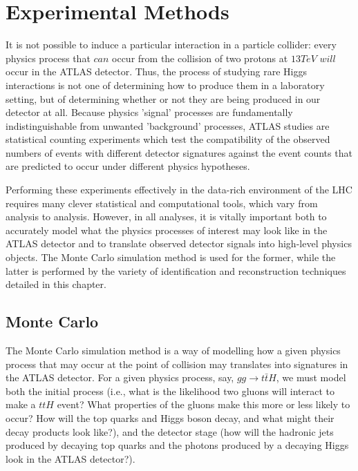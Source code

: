 \section{Experimental Methods} \label{sec:methods} 

It is not possible to induce a particular interaction in a particle collider: every physics process that $can$ occur from the collision of two protons at $13 TeV$ $will$ occur in the ATLAS detector. Thus, the process of studying rare Higgs interactions is not one of determining how to produce them in a laboratory setting, but of determining whether or not they are being produced in our detector at all. Because physics 'signal' processes are fundamentally indistinguishable from unwanted 'background' processes, ATLAS studies are statistical counting experiments which test the compatibility of the observed numbers of events with different detector signatures against the event counts that are predicted to occur under different physics hypotheses. 

Performing these experiments effectively in the data-rich environment of the LHC requires many clever statistical and computational tools, which vary from analysis to analysis. However, in all analyses, it is vitally important both to accurately model what the physics processes of interest may look like in the ATLAS detector and to translate observed detector signals into high-level physics objects. The Monte Carlo simulation method is used for the former, while the latter is performed by the variety of identification and reconstruction techniques detailed in this chapter.

\subsection{Monte Carlo} \label{sec:MC} 

The Monte Carlo simulation method is a way of modelling how a given physics process that may occur at the point of collision may translates into signatures in the ATLAS detector. For a given physics process, say, $gg \rightarrow t \bar{t} H$, we must model both the initial process (i.e., what is the likelihood two gluons will interact to make a $ttH$ event? What properties of the gluons make this more or less likely to occur? How will the top quarks and Higgs boson decay, and what might their decay products look like?), and the detector stage (how will the hadronic jets produced by decaying top quarks and the photons produced by a decaying Higgs look in the ATLAS detector?).

